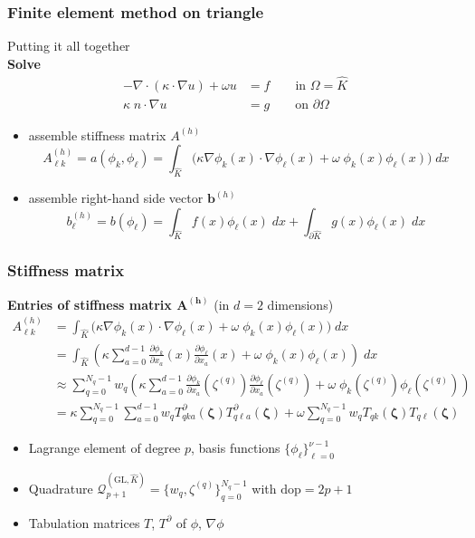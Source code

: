 \documentclass{beamer}
\begin{document}
\begin{frame}
\frametitle{Finite element method on triangle}
Putting it all together\\[2ex]
\textbf{Solve}
$$
\begin{aligned}
-\nabla\cdot(\kappa \cdot \nabla u) + \omega u &= f\qquad\text{in $\Omega=\widehat{K}$}\\
\kappa\; n\cdot \nabla u&=g \qquad\text{on $\partial\Omega$}
\end{aligned}
$$
\begin{itemize}
\item assemble stiffness matrix $A^{(h)}$
$$
A^{(h)}_{\ell k} = a(\phi_k,\phi_\ell) = \int_{\widehat{K}} \Big(\kappa \nabla \phi_k(x) \cdot\nabla\phi_\ell(x) + \omega\; \phi_k(x) \phi_\ell(x)\Big)\;dx
$$
\item assemble right-hand side vector $\boldsymbol{b}^{(h)}$
$$
b^{(h)}_\ell = b(\phi_\ell) = \int_{\widehat{K}} f(x)\phi_\ell(x)\;dx + \int_{\partial \widehat{K}} g(x)\phi_\ell(x)\;dx
$$
\end{itemize}
\end{frame}


\begin{frame}
\frametitle{Stiffness matrix}
\textbf{Entries of stiffness matrix $\boldsymbol{A^{(h)}}$} (in $d=2$ dimensions)
$$
\begin{aligned}
A^{(h)}_{\ell k}  &= \int_{\widehat{K}} \Big(\kappa \nabla \phi_k(x) \cdot\nabla\phi_\ell(x) + \omega\; \phi_k(x) \phi_\ell(x)\Big)\;dx\\
&= \int_{\widehat{K}} \left(\kappa \sum_{a=0}^{d-1}\frac{\partial\phi_k}{\partial x_a}(x) \frac{\partial\phi_\ell}{\partial x_a}(x) + \omega\; \phi_k(x) \phi_\ell(x)\right)\;dx\\
&\approx 
\sum_{q=0}^{N_q-1} w_q\left(\kappa \sum_{a=0}^{d-1}\frac{\partial\phi_k}{\partial x_a}(\zeta^{(q)}) \frac{\partial\phi_\ell}{\partial x_a}(\zeta^{(q)}) + \omega\; \phi_k(\zeta^{(q)}) \phi_\ell(\zeta^{(q)})\right)\\
&= \kappa \sum_{q=0}^{N_q-1}\sum_{a=0}^{d-1} w_q  T^\partial_{qk a} (\boldsymbol{\zeta})T^\partial_{q\ell a} (\boldsymbol{\zeta})
+\omega \sum_{q=0}^{N_q-1} w_qT_{qk}(\boldsymbol{\zeta})T_{q\ell}(\boldsymbol{\zeta})
\end{aligned}
$$
\begin{itemize}
  \item Lagrange element of degree $p$, basis functions $\{\phi_\ell\}_{\ell=0}^{\nu-1}$
  \item Quadrature $\mathcal{Q}_{p+1}^{(\text{GL},\widehat{K})}=\{w_q,\zeta^{(q)}\}_{q=0}^{N_q-1}$ with $\text{dop}=2p+1$
  \item Tabulation matrices $T$, $T^\partial$ of $\phi$, $\nabla\phi$
\end{itemize}
\end{frame}
\end{document}
